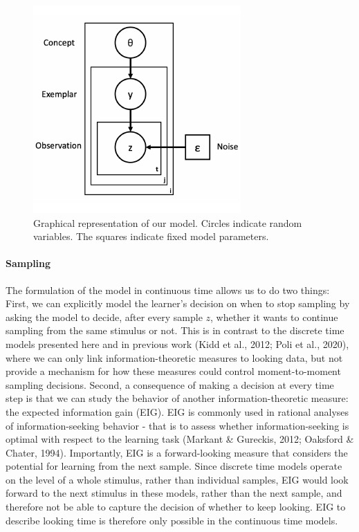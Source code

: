 \documentclass[10pt, letterpaper]{article}
\newenvironment{CodeChunk}{}{}
\begin{document}
\begin{CodeChunk}
\begin{figure}[H]

{\centering \includegraphics{figs/plate_diagram-1} 

}

\caption[Graphical representation of our model]{Graphical representation of our model. Circles indicate random variables. The squares indicate fixed model parameters.}\label{fig:plate_diagram}
\end{figure}
\end{CodeChunk}

\hypertarget{sampling}{%
\paragraph{Sampling}\label{sampling}}

The formulation of the model in continuous time allows us to do two
things: First, we can explicitly model the learner's decision on when to
stop sampling by asking the model to decide, after every sample \(z\),
whether it wants to continue sampling from the same stimulus or not.
This is in contrast to the discrete time models presented here and in
previous work (Kidd et al., 2012; Poli et al., 2020), where we can only
link information-theoretic measures to looking data, but not provide a
mechanism for how these measures could control moment-to-moment sampling
decisions. Second, a consequence of making a decision at every time step
is that we can study the behavior of another information-theoretic
measure: the expected information gain (EIG). EIG is commonly used in
rational analyses of information-seeking behavior - that is to assess
whether information-seeking is optimal with respect to the learning task
(Markant \& Gureckis, 2012; Oaksford \& Chater, 1994). Importantly, EIG
is a forward-looking measure that considers the potential for learning
from the next sample. Since discrete time models operate on the level of
a whole stimulus, rather than individual samples, EIG would look forward
to the next stimulus in these models, rather than the next sample, and
therefore not be able to capture the decision of whether to keep
looking. EIG to describe looking time is therefore only possible in the
continuous time models.
\end{document}
